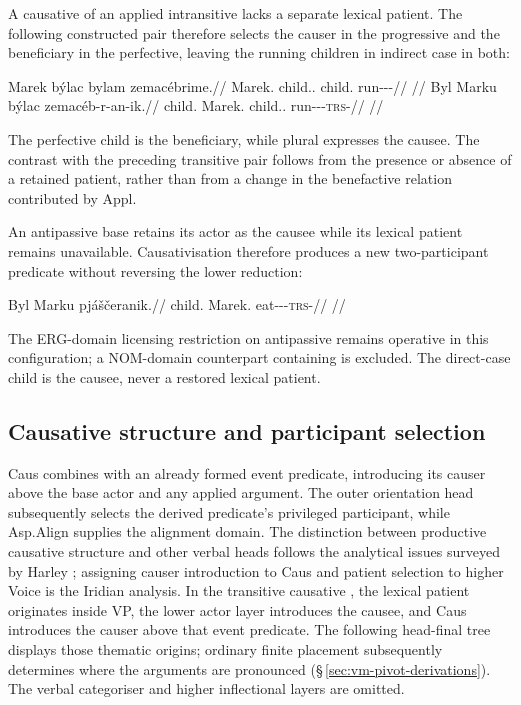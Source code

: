 A causative of an applied intransitive lacks a separate lexical patient.
The following constructed pair therefore selects the causer in the
progressive and the beneficiary in the perfective, leaving the running
children in indirect case in both:

\pex\label{ex:val-caus-appl-intransitive}
\a
\begingl
\gla Marek býlac bylam zemacébrime.//
\glb Marek.\Dir{} child.\Ind{}.\Pl{} child.\Ind{} run-\Appl{}-\Caus{}-\Prog{}//
\glft {}//
\endgl
\a
\begingl
\gla Byl Marku býlac zemacéb-r-an-ik.//
\glb child.\Dir{} Marek.\Trs{} child.\Ind{}.\Pl{} run-\Appl{}-\Caus{}-\textsc{trs}-\Pf{}//
\glft {}//
\endgl
\xe

The perfective child is the beneficiary, while plural 
expresses the causee. The contrast with the preceding transitive pair
follows from the presence or absence of a retained patient, rather than from
a change in the benefactive relation contributed by Appl.

An antipassive base retains its actor as the causee while its lexical patient
remains unavailable. Causativisation therefore produces a new two-participant
predicate without reversing the lower reduction:

\ex\label{ex:val-caus-antipassive}
\begingl
\gla Byl Marku pjáščeranik.//
\glb child.\Dir{} Marek.\Trs{} eat-\Antip{}-\Caus{}-\textsc{trs}-\Pf{}//
\glft {}//
\endgl
\xe

The ERG-domain licensing restriction on antipassive remains operative in this
configuration; a NOM-domain counterpart containing  is excluded.
The direct-case child is the causee, never a restored lexical patient.

\subsection{Causative structure and participant selection}
\label{sec:vm-caus}

Caus combines with an already formed event predicate, introducing its causer
above the base actor and any applied argument. The outer orientation head
subsequently selects the derived predicate's privileged participant, while
Asp.Align supplies the alignment domain. The distinction between productive
causative structure and other verbal heads follows the analytical issues
surveyed by Harley \cite[§1.4]{harley2017}; assigning causer introduction
to Caus and patient selection to higher Voice is the Iridian analysis.
In the transitive causative , the lexical patient originates
inside VP, the lower actor layer introduces the causee, and Caus introduces
the causer above that event predicate. The following head-final tree displays
those thematic origins; ordinary finite placement subsequently determines
where the arguments are pronounced (§\,\ref{sec:vm-pivot-derivations}). The
verbal categoriser and higher inflectional layers are omitted.

